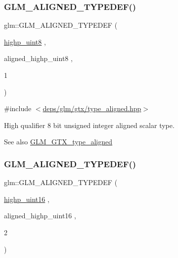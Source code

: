 \subsubsection{\texorpdfstring{G\+L\+M\+\_\+\+A\+L\+I\+G\+N\+E\+D\+\_\+\+T\+Y\+P\+E\+D\+E\+F()}{GLM\_ALIGNED\_TYPEDEF()}\hspace{0.1cm}{\footnotesize\ttfamily [93/209]}}
{\footnotesize\ttfamily glm\+::\+G\+L\+M\+\_\+\+A\+L\+I\+G\+N\+E\+D\+\_\+\+T\+Y\+P\+E\+D\+EF (\begin{DoxyParamCaption}\item[{\hyperlink{group__gtc__type__precision_ga2c27c6dd26e893786f04b10f99c1ee95}{highp\+\_\+uint8}}]{,  }\item[{aligned\+\_\+highp\+\_\+uint8}]{,  }\item[{1}]{ }\end{DoxyParamCaption})}



{\ttfamily \#include $<$\hyperlink{gtx_2type__aligned_8hpp}{deps/glm/gtx/type\+\_\+aligned.\+hpp}$>$}

High qualifier 8 bit unsigned integer aligned scalar type. \begin{DoxySeeAlso}{See also}
\hyperlink{group__gtx__type__aligned}{G\+L\+M\+\_\+\+G\+T\+X\+\_\+type\+\_\+aligned} 
\end{DoxySeeAlso}
\mbox{\label{group__gtx__type__aligned_ga447848a817a626cae08cedc9778b331c}} 
\subsubsection{\texorpdfstring{G\+L\+M\+\_\+\+A\+L\+I\+G\+N\+E\+D\+\_\+\+T\+Y\+P\+E\+D\+E\+F()}{GLM\_ALIGNED\_TYPEDEF()}\hspace{0.1cm}{\footnotesize\ttfamily [94/209]}}
{\footnotesize\ttfamily glm\+::\+G\+L\+M\+\_\+\+A\+L\+I\+G\+N\+E\+D\+\_\+\+T\+Y\+P\+E\+D\+EF (\begin{DoxyParamCaption}\item[{\hyperlink{group__gtc__type__precision_ga4d32967d45ba8365e2a05eaaac85e978}{highp\+\_\+uint16}}]{,  }\item[{aligned\+\_\+highp\+\_\+uint16}]{,  }\item[{2}]{ }\end{DoxyParamCaption})}



